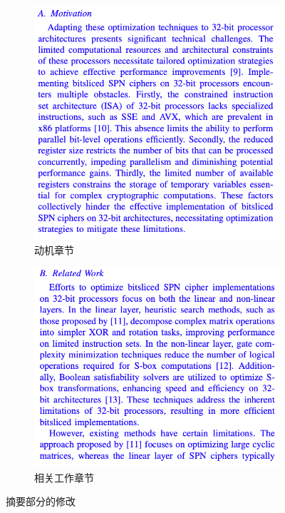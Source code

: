 \documentclass[11pt,a4paper]{article}
\begin{document}
\begin{figure}[h]
  \centering
  \begin{subfigure}[b]{0.3\textwidth}
    \centering
    \includegraphics[width=\textwidth]{./fig/motivation.png}
    \caption{动机章节}
    \label{fig:motivation}
  \end{subfigure}
  \hfill
  \begin{subfigure}[b]{0.3\textwidth}
    \centering
    \includegraphics[width=\textwidth]{./fig/relatedWork.png}
    \caption{相关工作章节}
    \label{fig:related_work}
  \end{subfigure}
  \caption{摘要部分的修改}
  \label{fig:combined_figure}
\end{figure}
\end{document}
